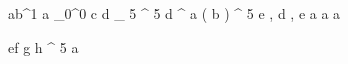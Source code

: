 \begin{eqcode}{a}{b}{^1}{}
  a \gets {}_0^0 \lend
  c \gets d _ 5 ^ 5 \lend
  d \gets \genar \limits ^ { a } ( b ) ^ 5 \lend
  e , d , e  \lend
  a \gets {} \lend
  a \gets {} \lend
  a \gets {} \lend
\end{eqcode}


\begin{eqcode}{e}{f}{}{}
  g \gets h ^ 5 \lend
  a  \lend
\end{eqcode}
